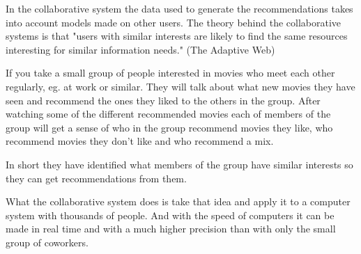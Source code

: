 In the collaborative system the data used to generate the recommendations takes into account models made on other users. The theory behind the collaborative systems is that "users with similar interests are likely to find the same resources interesting for similar information needs." (The Adaptive Web)

If you take a small group of people interested in movies who meet each other regularly, eg. at work or similar. They will talk about what new movies they have seen and recommend the ones they liked to the others in the group. After watching some of the different recommended movies each of members of the group will get a sense of who in the group recommend movies they like, who recommend movies they don't like and who recommend a mix.

In short they have identified what members of the group have similar interests so they can get recommendations from them.

What the collaborative system does is take that idea and apply it to a computer system with thousands of people. And with the speed of computers it can be made in real time and with a much higher precision than with only the small group of coworkers.
